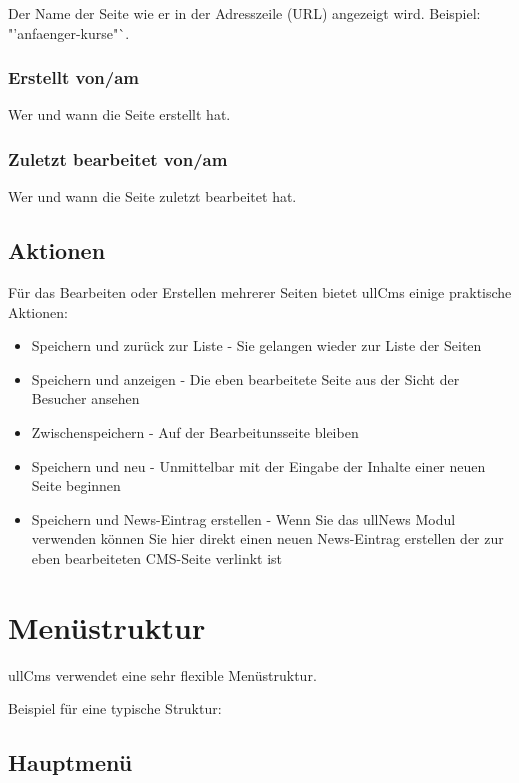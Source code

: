 \documentclass[article, a4paper, oneside, 11pt]{memoir}
\begin{document}
Der Name der Seite wie er in der Adresszeile (URL) angezeigt wird. Beispiel: "'anfaenger-kurse"`.

\subsection{Erstellt von/am}

Wer und wann die Seite erstellt hat.

\subsection{Zuletzt bearbeitet von/am}

Wer und wann die Seite zuletzt bearbeitet hat.



\section{Aktionen}

Für das Bearbeiten oder Erstellen mehrerer Seiten bietet ullCms einige praktische Aktionen:

\begin{itemize}
\item Speichern und zurück zur Liste - Sie gelangen wieder zur Liste der Seiten
\item Speichern und anzeigen - Die eben bearbeitete Seite aus der Sicht der Besucher ansehen
\item Zwischenspeichern - Auf der Bearbeitunsseite bleiben
\item Speichern und neu - Unmittelbar mit der Eingabe der Inhalte einer neuen Seite beginnen
\item Speichern und News-Eintrag erstellen - Wenn Sie das ullNews Modul verwenden können Sie hier direkt einen neuen News-Eintrag erstellen der zur eben bearbeiteten CMS-Seite verlinkt ist
\end{itemize}





\chapter{Menüstruktur}

ullCms verwendet eine sehr flexible Menüstruktur. 

Beispiel für eine typische Struktur:

\section{Hauptmenü}
\end{document}
